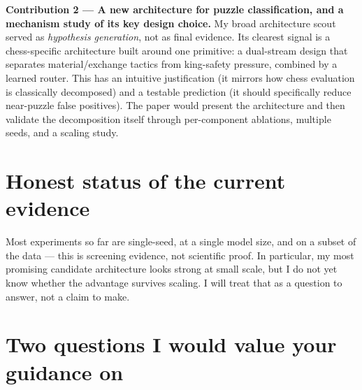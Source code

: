 \documentclass[11pt,a4paper]{article}
\begin{document}
\textbf{Contribution 2 --- A new architecture for puzzle classification, and a mechanism
study of its key design choice.} My broad architecture scout served as \emph{hypothesis
generation}, not as final evidence. Its clearest signal is a chess-specific architecture
built around one primitive: a dual-stream design that separates material/exchange tactics
from king-safety pressure, combined by a learned router. This has an intuitive justification
(it mirrors how chess evaluation is classically decomposed) and a testable prediction (it
should specifically reduce near-puzzle false positives). The paper would present the
architecture and then validate the decomposition itself through per-component ablations,
multiple seeds, and a scaling study.

\section{Honest status of the current evidence}

Most experiments so far are single-seed, at a single model size, and on a subset of the
data --- this is screening evidence, not scientific proof. In particular, my most promising
candidate architecture looks strong at small scale, but I do not yet know whether the
advantage survives scaling. I will treat that as a question to answer, not a claim to make.

\section{Two questions I would value your guidance on}
\end{document}
